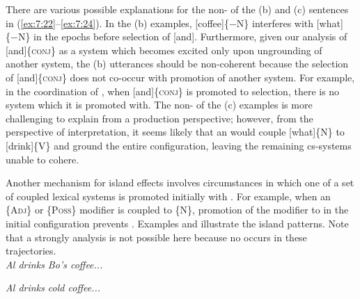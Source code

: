   There are various possible explanations for the non- of the (b) and (c) sentences in (\ref{ex:7:22}--\ref{ex:7:24}). In the (b) examples, [coffee]\{−N\} interferes with [what]\{−N\} in the epochs before selection of [and]. Furthermore, given our analysis of [and]\linebreak\{\textsc{conj}\} as a system which becomes excited only upon ungrounding of another system, the (b) utterances should be non-coherent because the selection of [and]\linebreak\{\textsc{conj}\} does not co-occur with promotion of another system. For example, in the  coordination of , when [and]\{\textsc{conj}\} is promoted to selection, there is no system which it is promoted with. The non- of the (c) examples is more challenging to explain from a production perspective; however, from the perspective of interpretation, it seems likely that an  would couple [what]\{N\} to [drink]\{V\} and ground the entire configuration, leaving the remaining cs-systems unable to cohere.

Another mechanism for island effects involves circumstances in which one of a set of coupled lexical systems is promoted initially with . For example, when an \{A\textsc{dj}\} or \{P\textsc{oss}\} modifier is coupled to \{N\}, promotion of the modifier to  in the initial configuration prevents . Examples  and  illustrate the island patterns. Note that a strongly  analysis is not possible here because no  occurs in these trajectories.\\

\noindent \textit{Al drinks Bo's coffee...}
\label{ex:7:25}
    \label{ex:7:25a}
    \label{ex:7:25b}
\z
\z
\pagebreak
{}\label{ex:7:26}
    \label{ex:7:26a}
    \label{ex:7:26b}
\z
\z

\noindent \textit{Al drinks cold coffee...}
\label{ex:7:27}
    \label{ex:7:27a}
    \label{ex:7:27b}
\z
\z

\label{ex:7:28}
    \label{ex:7:28a}
    \label{ex:7:28b}
\z
\z

